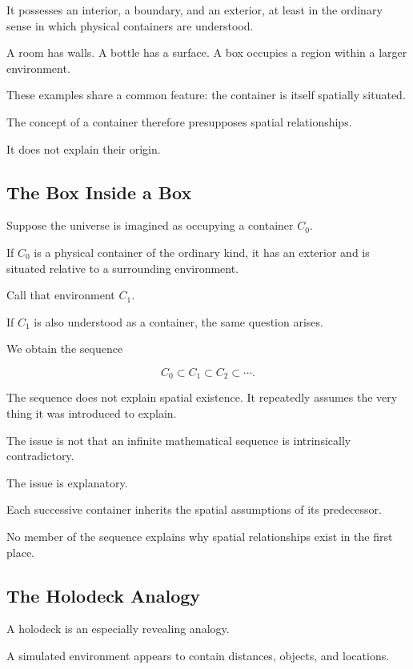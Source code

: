 \documentclass[12pt,onecolumn]{article}
\begin{document}
It possesses an interior, a boundary, and an exterior,
at least in the ordinary sense in which physical
containers are understood.

A room has walls. A bottle has a surface. A box
occupies a region within a larger environment.

These examples share a common feature: the
container is itself spatially situated.

The concept of a container therefore presupposes
spatial relationships.

It does not explain their origin.

\subsection{The Box Inside a Box}

Suppose the universe is imagined as occupying
a container $C_0$.

If $C_0$ is a physical container of the ordinary
kind, it has an exterior and is situated relative
to a surrounding environment.

Call that environment $C_1$.

If $C_1$ is also understood as a container,
the same question arises.

We obtain the sequence

\begin{equation}
C_0 \subset C_1 \subset C_2
\subset \cdots .
\end{equation}

The sequence does not explain spatial existence.
It repeatedly assumes the very thing it was
introduced to explain.

The issue is not that an infinite mathematical
sequence is intrinsically contradictory.

The issue is explanatory.

Each successive container inherits the spatial
assumptions of its predecessor.

No member of the sequence explains why spatial
relationships exist in the first place.

\subsection{The Holodeck Analogy}

A holodeck is an especially revealing analogy.

A simulated environment appears to contain
distances, objects, and locations.
\end{document}
